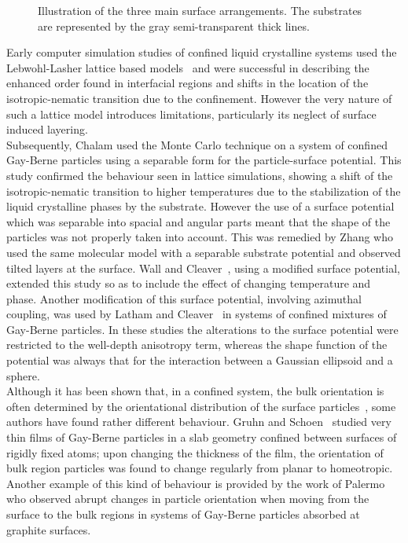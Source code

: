 \picW=4.5cm
\begin{figure}
	\centering
	\caption[The main surface arrangements]{Illustration of the three main surface arrangements.
	The substrates are represented by the gray semi-transparent thick lines.}
	\label{fig:SurfArrangements}
\end{figure}

Early computer simulation studies of confined liquid crystalline systems used the
Lebwohl-Lasher lattice based models~\cite{TeloDaGammaTarazona90,CleaverAllen93} and were successful in
describing the enhanced order found in interfacial regions and shifts in the location of the 
isotropic-nematic transition due to the confinement. However the very nature of such a lattice
model introduces limitations, particularly its neglect of surface induced layering.\\

Subsequently, 
Chalam \etal\cite{ChalamGubbins91} used the Monte Carlo technique on a system of confined 
Gay-Berne particles using a separable form for the particle-surface potential. This
study confirmed the behaviour seen in lattice simulations, showing a shift of the 
isotropic-nematic transition to
higher temperatures due to the stabilization of the liquid crystalline phases by the
substrate. However the use of a surface potential which was separable into spacial and 
angular parts meant that the shape of the particles was not properly taken into account. This
was remedied by Zhang \etal\cite{ZhangChakrabarti96} who used the same molecular model with 
a separable substrate potential and observed tilted layers at the surface. Wall and
Cleaver~\cite{WallCleaver97}, using a modified surface potential, extended this study so as to
include the effect of changing temperature and phase. 
Another modification of this surface potential, involving azimuthal coupling, was used by Latham and 
Cleaver~\cite{LathamCleaver00} in systems of confined
mixtures of Gay-Berne particles. In these studies the alterations to the surface potential were
restricted to the well-depth anisotropy term, whereas the shape function of the potential was
always that for the interaction between a Gaussian ellipsoid and a sphere.\\

Although it has been shown that, in a confined system, the bulk orientation is often determined by the
orientational distribution of the surface particles~\cite{ZhangChakrabarti96}, some
authors have found rather different behaviour. Gruhn and
Schoen~\cite{GruhnSchoen97,GruhnSchoen98,GruhnSchoen98a} studied very thin films of Gay-Berne 
particles in a slab geometry confined between surfaces of rigidly fixed atoms; 
upon changing the thickness of the film, the orientation of bulk 
region particles was found to change regularly from planar to homeotropic. Another example 
of this kind of behaviour is 
provided by the work of Palermo \etal\cite{PalermoBiscarini98} who observed abrupt changes 
in particle orientation when moving from the surface to the bulk regions in systems of Gay-Berne 
particles absorbed at graphite surfaces.\\

